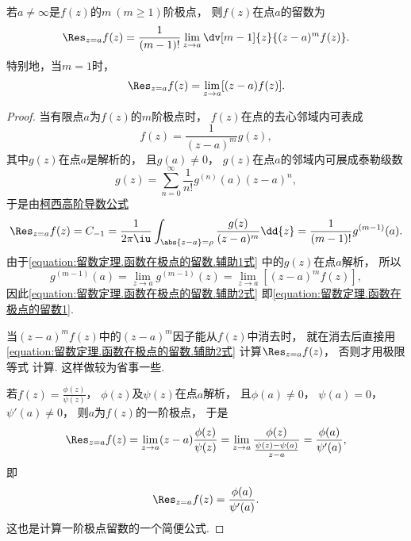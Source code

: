 \begin{property}
若\(a\neq\infty\)是\(f(z)\)的\(m\ (m\geq1)\)阶极点，
则\(f(z)\)在点\(a\)的留数为
\begin{equation}\label{equation:留数定理.函数在极点的留数1}
	\Res_{z=a} f(z)
	= \frac{1}{(m-1)!} \lim_{z \to a} \dv[m-1]{z} \{ (z-a)^m f(z) \}.
\end{equation}
特别地，当\(m=1\)时，
\begin{equation}\label{equation:留数定理.函数在极点的留数2}
	\Res_{z=a} f(z)
	= \lim_{z \to a} [(z-a) f(z)].
\end{equation}
\begin{proof}
当有限点\(a\)为\(f(z)\)的\(m\)阶极点时，
\(f(z)\)在点的去心邻域内可表成
\begin{equation}\label{equation:留数定理.函数在极点的留数.辅助1式}
	f(z) = \frac{1}{(z-a)^m} g(z),
\end{equation}
其中\(g(z)\)在点\(a\)是解析的，
且\(g(a)\neq0\)，
\(g(z)\)在点\(a\)的邻域内可展成泰勒级数\begin{equation*}
	g(z) = \sum_{n=0}^\infty \frac{1}{n!} g^{(n)}(a) (z-a)^n,
\end{equation*}
于是由\hyperref[equation:解析函数的积分表示.柯西高阶导数公式]{柯西高阶导数公式}
\begin{equation}\label{equation:留数定理.函数在极点的留数.辅助2式}
	\Res_{z=a} f(z) = C_{-1}
	= \frac{1}{2\pi\iu} \int_{\abs{z-a}=\rho} \frac{g(z)}{(z-a)^m} \dd{z}
	= \frac{1}{(m-1)!} g^{(m-1)}(a).
\end{equation}
由于\cref{equation:留数定理.函数在极点的留数.辅助1式} 中的\(g(z)\)在点\(a\)解析，
所以\begin{equation*}
	g^{(m-1)}(a) = \lim_{z \to a} g^{(m-1)}(z)
	= \lim_{z \to a} [(z-a)^m f(z)],
\end{equation*}
因此\cref{equation:留数定理.函数在极点的留数.辅助2式}
即\cref{equation:留数定理.函数在极点的留数1}.

当\((z-a)^m f(z)\)中的\((z-a)^m\)因子能从\(f(z)\)中消去时，
就在消去后直接用\cref{equation:留数定理.函数在极点的留数.辅助2式}
计算\(\Res_{z=a} f(z)\)，
否则才用极限等式  计算.
这样做较为省事一些.

若\(f(z) = \frac{\phi(z)}{\psi(z)}\)，
\(\phi(z)\)及\(\psi(z)\)在点\(a\)解析，
且\(\phi(a)\neq0\)，
\(\psi(a)=0\)，
\(\psi'(a)\neq0\)，
则\(a\)为\(f(z)\)的一阶极点，
于是\begin{equation*}
	\Res_{z=a} f(z)
	= \lim_{z \to a} (z-a) \frac{\phi(z)}{\psi(z)}
	= \lim_{z \to a} \frac{\phi(z)}{\frac{\psi(z)-\psi(a)}{z-a}}
	= \frac{\phi(a)}{\psi'(a)},
\end{equation*}
即\begin{equation}\label{equation:留数定理.函数在极点的留数3}
	\Res_{z=a} f(z)
	= \frac{\phi(a)}{\psi'(a)}.
\end{equation}
这也是计算一阶极点留数的一个简便公式.
\end{proof}
\end{property}

